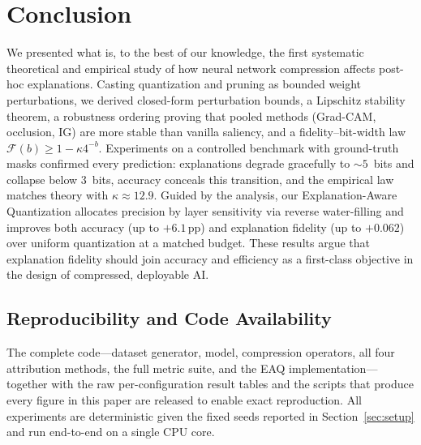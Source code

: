 \section{Conclusion}
\label{sec:conclusion}
We presented what is, to the best of our knowledge, the first systematic
theoretical and empirical study of how neural network compression affects
post-hoc explanations. Casting quantization and
pruning as bounded weight perturbations, we derived closed-form perturbation
bounds, a Lipschitz stability theorem, a robustness ordering proving that pooled
methods (Grad-CAM, occlusion, IG) are more stable than vanilla saliency, and a
fidelity--bit-width law $\mathcal F(b)\ge1-\kappa 4^{-b}$. Experiments on a
controlled benchmark with ground-truth masks confirmed every prediction:
explanations degrade gracefully to $\sim\!5$~bits and collapse below $3$~bits,
accuracy conceals this transition, and the empirical law matches theory with
$\kappa\approx12.9$. Guided by the analysis, our Explanation-Aware Quantization
allocates precision by layer sensitivity via reverse water-filling and improves
both accuracy (up to $+6.1$\,pp) and explanation fidelity (up to $+0.062$) over
uniform quantization at a matched budget. These results argue that explanation
fidelity should join accuracy and efficiency as a first-class objective in the
design of compressed, deployable AI.

\subsection{Reproducibility and Code Availability}
\label{sec:repro}
The complete code---dataset generator, model, compression operators, all four
attribution methods, the full metric suite, and the EAQ implementation---together
with the raw per-configuration result tables and the scripts that produce every
figure in this paper are released to enable exact reproduction. All experiments
are deterministic given the fixed seeds reported in Section~\ref{sec:setup} and
run end-to-end on a single CPU core.
